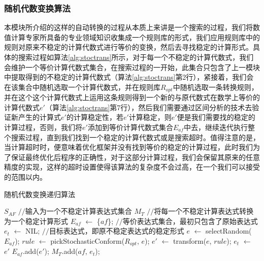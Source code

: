 \subsubsection{随机代数变换算法}
本模块所介绍的这样的自动转换的过程从本质上来讲是一个搜索的过程，我们将数值计算专家所具备的专业领域知识收集成一个规则库的形式，我们应用规则库中的规则对原来不稳定的计算代数式进行等价的变换，然后去寻找稳定的计算形式。具体的搜索过程如算法\ref{alg:stoctrans}所示，对于每一个不稳定的计算代数式，我们会维护一个等价计算代数式集合，在搜索过程的一开始，此集合只包含了上一模块中提取得到的不稳定的计算代数式（算法\ref{alg:stoctrans}第2行），紧接着，我们会在该集合中随机选取一个计算代数式，并在规则库$R_{opt}$中随机选取一条转换规则，并在这个这个计算代数式上运用这条规则得到一个新的与原代数式在数学上等价的计算代数式$e'$（算法\ref{alg:stoctrans}第7行），然后我们需要通过区间分析的技术去验证新产生的计算式$e'$的计算稳定性，若$e'$计算稳定，则$e'$便是我们需要找的稳定的计算过程，否则，我们将$e'$添加到等价计算代数式集合$E_{af}$中去，继续迭代执行整个搜索过程，直到我们找到一个稳定的计算代数式或是搜索超时。值得注意的是，当计算超时时，便意味着优化框架并没有找到等价的稳定的计算过程，此时我们为了保证最终优化后程序的正确性，对于这部分计算过程，我们会保留其原来的任意精度的实现，这样的超时设置使得该算法的复杂度不会过高，在一个我们可以接受的范围以内。

\begin{algorithm}[tb]
  \caption{随机代数变换递归算法}
  \label{alg:stoctrans}
\begin{algorithmic}[1]
\REQUIRE $S_{AF}$ \hfill {{\footnotesize$//$}\small 输入为一个不稳定计算表达式集合}
\ENSURE $M_{T}$  {{\footnotesize$//$}\small 将每一个不稳定计算表达式转换为一个稳定计算形式} %
      \STATE $E_{af}$ $\leftarrow$ \{$af$\}; \hfill {{\footnotesize$//$}\small 等价表达式集合，最初只包含了原始表达式} \label{alg:stoctrans:eqset}
      \STATE $e_t$ $\leftarrow$ NIL; \hfill {{\footnotesize$//$}\small 目标表达式，即原不稳定表达式的稳定形式}
      \REPEAT
        \STATE $e$ $\leftarrow$ selectRandom($E_{af}$); \label{alg:stoctrans:expselect}%
        \STATE $rule$ $\leftarrow$ pickStochasticConform($R_{opt}$, $e$); \label{alg:stoctrans:rulepick}
        \STATE $e'$ $\leftarrow$ transform($e$, $rule$); \label{alg:stoctrans:applytrans}
         \label{alg:stoctrans:stableverify}
          \STATE $e_t$ $\leftarrow$ $e'$ \label{alg:stoctrans:getet}
        \ELSE
          \STATE $E_{af}$.add($e'$); \label{alg:stoctrans:putbackep}%
        \ENDIF
      \STATE $M_{T}$.add($af$, $e_t$); \label{alg:stoctrans:resultmap}
    \ENDFOR
\end{algorithmic}
\end{algorithm}

